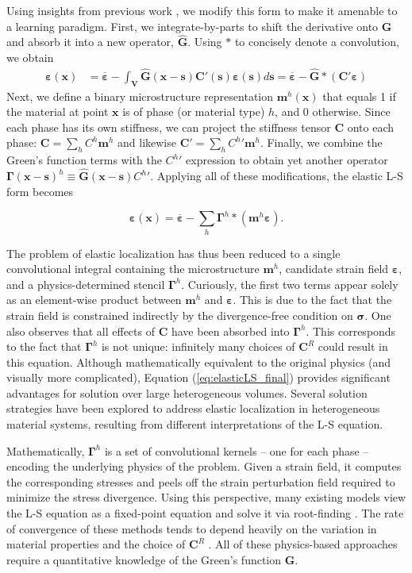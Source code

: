 \documentclass[3p, preprint]{elsarticle}
\newcommand{\bmeps}{\bm{\varepsilon}}
\newcommand{\epsavg}{\overline{\bmeps}}
\newcommand{\bmgam}{\bm{\Gamma}}
\newcommand{\conv}{\ast}
\newcommand{\bmx}{\bm{x}}
\newcommand{\bms}{\bm{s}}
\newcommand{\bmm}{\bm{m}}
\newcommand{\Gop}{\bm{G}}
\newcommand{\Ghat}{\widehat{\Gop}}
\begin{document}
Using insights from previous work \cite{yang2019,kalidindi_bayes_2019,landi2010}, we modify this form to make it amenable to a learning paradigm. First, we integrate-by-parts to shift the derivative onto $\Gop$ and absorb it into a new operator, $\Ghat$. Using $\conv$ to concisely denote a convolution, we obtain 
\begin{align}
\bmeps(\bmx) &= \epsavg - \int_{\bm{V}} {\Ghat}(\bmx - \bms) \bm{C}'(\bms) \bmeps(\bms) d\bms = \epsavg - \Ghat \conv (\bm{C}' \bmeps) \label{apeq:elasticLS_after}
\end{align}
\noindent Next, we define a binary microstructure representation $\bmm^h(\bmx)$ that equals 1 if the material at point $\bmx$ is of phase (or material type) $h$, and 0 otherwise. Since each phase has its own stiffness, we can project the stiffness tensor $\bm{C}$ onto each phase: $\bm{C} = \sum_h {C}^h \bmm^h$ and likewise $\bm{C'} = \sum_h {C^h}' \bmm^h$. 
Finally, we combine the Green's function terms with the ${C^h}'$ expression to obtain yet another operator $\bmgam(\bmx - \bms)^h \equiv \Ghat(\bmx - \bms) {C^h}'$. Applying all of these modifications, the elastic L-S form becomes

\begin{equation}
\bmeps(\bmx) = \epsavg - \sum\limits_h \bmgam^h \conv \left( \bmm^h \bmeps \right) .
\label{eq:elasticLS_final}  
\end{equation}

The problem of elastic localization has thus been reduced to a single convolutional integral containing the microstructure $\bmm^h$, candidate strain field $\bmeps$, and a physics-determined stencil $\bmgam^h$. Curiously, the first two terms appear solely as an element-wise product between $\bmm^h$ and $\bmeps$. This is due to the fact that the strain field is constrained indirectly by the divergence-free condition on $\bm{\sigma}$. One also observes that all effects of $\bm{C}$ have been absorbed into $\bmgam^h$. This corresponds to the fact that $\bmgam^h$ is not unique: infinitely many choices of $\bm{C}^R$ could result in this equation. Although mathematically equivalent to the original physics (and visually more complicated), Equation (\ref{eq:elasticLS_final}) provides significant advantages for solution over large heterogeneous volumes. Several solution strategies have been explored to address elastic localization in heterogeneous material systems, resulting from different interpretations of the L-S equation.

Mathematically, $\bmgam^h$ is a set of convolutional kernels -- one for each phase -- encoding the underlying physics of the problem. Given a strain field, it computes the corresponding stresses and peels off the strain perturbation field required to minimize the stress divergence. Using this perspective, many existing models view the L-S equation as a fixed-point equation and solve it via root-finding \cite{moulinec1998}. The rate of convergence of these methods tends to depend heavily on the variation in material properties and the choice of $\bm{C}^R$ \cite{lebensohn2020}. All of these physics-based approaches require a quantitative knowledge of the Green's function $\Gop$. 
\end{document}
